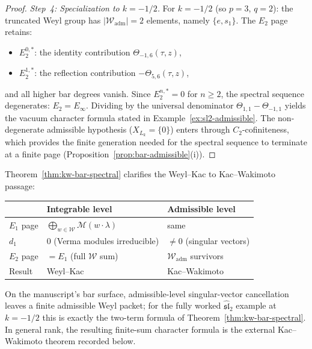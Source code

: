 \begin{proof}
\emph{Step~4: Specialization to $k = -1/2$.}
For $k = -1/2$ (so $p = 3$, $q = 2$): the truncated Weyl group
has $|\mathcal{W}_{\mathrm{adm}}| = 2$ elements, namely $\{e, s_1\}$.
The $E_2$ page retains:
\begin{itemize}
\item $E_2^{0,*}$: the identity contribution $\Theta_{-1,6}(\tau,z)$,
\item $E_2^{1,*}$: the reflection contribution
$-\Theta_{5,6}(\tau,z)$,
\end{itemize}
and all higher bar degrees vanish.
Since $E_2^{n,*} = 0$ for $n \geq 2$, the spectral sequence
degenerates: $E_2 = E_\infty$. Dividing by the
universal denominator $\Theta_{1,1} - \Theta_{-1,1}$ yields
the vacuum character formula stated in
Example~\ref{ex:sl2-admissible}.
The non-degenerate admissible hypothesis ($X_{L_k} = \{0\}$)
enters through $C_2$-cofiniteness, which provides the finite
generation needed for the spectral sequence to terminate at a
finite page (Proposition~\ref{prop:bar-admissible}(i)).
\end{proof}

\begin{remark}
\label{rem:admissible-vs-integrable}
Theorem~\ref{thm:kw-bar-spectral} clarifies the Weyl--Kac to Kac--Wakimoto passage:
\begin{center}
\renewcommand{\arraystretch}{1.3}
\begin{tabular}{lll}
\toprule
& \textbf{Integrable level} & \textbf{Admissible level} \\
\midrule
$E_1$ page & $\bigoplus_{w \in \mathcal{W}} \mathcal{M}(w \cdot \lambda)$
& same \\
$d_1$ & $0$ (Verma modules irreducible) & $\neq 0$ (singular vectors) \\
$E_2$ page & $= E_1$ (full $\mathcal{W}$ sum) &
$\mathcal{W}_{\mathrm{adm}}$ survivors \\
Result & Weyl--Kac & Kac--Wakimoto \\
\bottomrule
\end{tabular}
\end{center}
On the manuscript's bar surface, admissible-level singular-vector
cancellation leaves a finite admissible Weyl packet; for the fully
worked $\widehat{\mathfrak{sl}}_2$ example at $k=-1/2$ this is exactly
the two-term formula of Theorem~\ref{thm:kw-bar-spectral}. In general
rank, the resulting finite-sum character formula is the external
Kac--Wakimoto theorem recorded below.
\end{remark}


